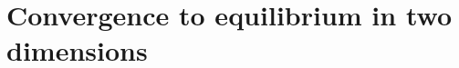 \documentclass[11pt,reqno]{amsart}
\theoremstyle{remark}
\newcommand \norm[1] {\left\Vert #1\right\Vert}
\def\d{{\rm d}}
\numberwithin{equation}{section}
\def\d{{\rm d}}
\newcommand{\uloc}{\operatorname{uloc}}
\begin{document}

\section{Convergence to equilibrium in two dimensions}
\label{s-convergence}
\end{document}
